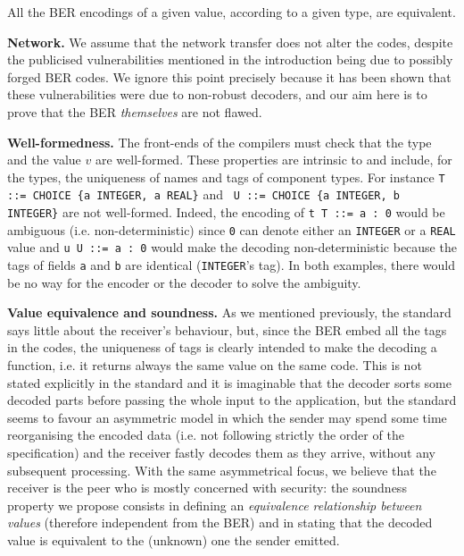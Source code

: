 \begin{proposition}\label{all_BER_codes}
All the BER encodings of a given value, according to a given type, are
equivalent.
\end{proposition}


\textbf{Network.} We assume that the network transfer does not alter
the codes, despite the publicised vulnerabilities mentioned in the
introduction being due to possibly forged BER codes. We ignore this
point precisely because it has been shown that these vulnerabilities
were due to non-robust decoders, and our aim here is to prove that the
BER \emph{themselves} are not flawed.

\medskip

\textbf{Well-formedness.} The front-ends of the \ASN compilers must
check that the type~\T{} and the value $v$ are well-formed. These
properties are intrinsic to \ASN and include, for the types, the
uniqueness of names and tags of component types. For instance
\texttt{\small T ::= CHOICE \{a INTEGER, a REAL\}} and \texttt{\small
U ::= CHOICE \{a INTEGER, b INTEGER\}} are not well-formed. Indeed,
the encoding of \texttt{\small t T ::= a : 0} would be ambiguous
(i.e. non\hyp{}deterministic) since \texttt{0} can denote either an
\texttt{\small INTEGER} or a \texttt{\small REAL} value and
\texttt{\small u U ::= a : 0} would make the decoding
non-deterministic because the tags of fields \texttt{\small a} and
\texttt{\small b} are identical (\texttt{\small INTEGER}'s tag). In
both examples, there would be no way for the encoder or the decoder to
solve the ambiguity.

\medskip

\textbf{Value equivalence and soundness.} As we mentioned previously,
the standard says little about the receiver's behaviour, but, since
the BER embed all the tags in the codes, the uniqueness of tags is
clearly intended to make the decoding a function, i.e. it returns
always the same value on the same code. This is not stated explicitly
in the standard and it is imaginable that the decoder sorts some
decoded parts before passing the whole input to the application, but
the standard seems to favour an asymmetric model in which the sender
may spend some time reorganising the encoded data (i.e. not following
strictly the order of the \ASN specification) and the receiver fastly
decodes them as they arrive, without any subsequent processing. With
the same asymmetrical focus, we believe that the receiver is the peer
who is mostly concerned with security: the soundness property we
propose consists in defining an \emph{equivalence relationship between
\ASN values} (therefore independent from the BER) and in stating that
the decoded value is equivalent to the (unknown) one the sender
emitted.

